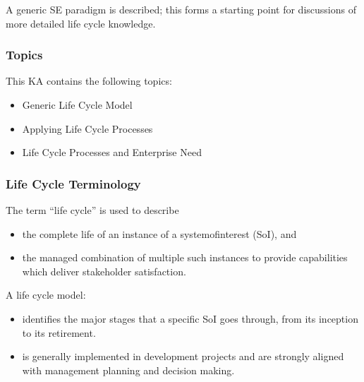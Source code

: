 \documentclass[letterpaper,10pt,english]{jupyterBook}
\begin{document}
\sphinxAtStartPar
A generic SE paradigm is described; this forms a starting point for discussions of more detailed life cycle knowledge.


\subsubsection{Topics}
\label{\detokenize{SE/sebok:topics}}
\sphinxAtStartPar
This KA contains the following topics:
\begin{itemize}
\item {} 
\sphinxAtStartPar
Generic Life Cycle Model

\item {} 
\sphinxAtStartPar
Applying Life Cycle Processes

\item {} 
\sphinxAtStartPar
Life Cycle Processes and Enterprise Need

\end{itemize}


\subsubsection{Life Cycle Terminology}
\label{\detokenize{SE/sebok:life-cycle-terminology}}
\sphinxAtStartPar
The term “life cycle” is used to describe
\begin{itemize}
\item {} 
\sphinxAtStartPar
the complete life of an instance of a system\sphinxhyphen{}of\sphinxhyphen{}interest (SoI), and

\item {} 
\sphinxAtStartPar
the managed combination of multiple such instances to provide capabilities which deliver stakeholder satisfaction.

\end{itemize}

\sphinxAtStartPar
A life cycle model:
\begin{itemize}
\item {} 
\sphinxAtStartPar
identifies the major stages that a specific SoI goes through, from its inception to its retirement.

\item {} 
\sphinxAtStartPar
is generally implemented in development projects and are strongly aligned with management planning and decision making.

\end{itemize}
\end{document}
